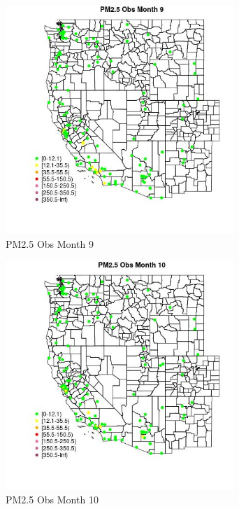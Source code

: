 \begin{figure} 
\centering  
\includegraphics[width=0.77\textwidth]{Code_Outputs/Report_ML_input_PM25_Step4_part_e_de_duplicated_aves_MapObsMo9PM25_Obs.jpg} 
\caption{\label{fig:Report_ML_input_PM25_Step4_part_e_de_duplicated_avesMapObsMo9PM25_Obs}PM2.5 Obs Month 9} 
\end{figure} 
 

\clearpage 

\begin{figure} 
\centering  
\includegraphics[width=0.77\textwidth]{Code_Outputs/Report_ML_input_PM25_Step4_part_e_de_duplicated_aves_MapObsMo10PM25_Obs.jpg} 
\caption{\label{fig:Report_ML_input_PM25_Step4_part_e_de_duplicated_avesMapObsMo10PM25_Obs}PM2.5 Obs Month 10} 
\end{figure} 
 


